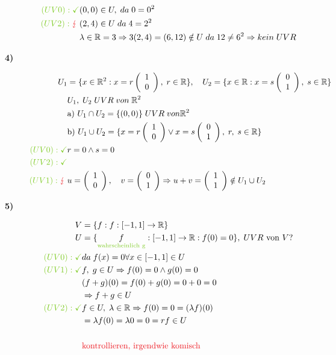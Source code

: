 \documentclass[12pt,a4paper]{article}%
\numberwithin{equation}{section}
\newcommand{\R}{\mathbb{R}} %
\def\colRed#1{\begingroup\color{Red}{#1}\endgroup}
\def\colGreen#1{\begingroup\color{LimeGreen}{#1}\endgroup}
\def\usGreen#1#2{\underset{\colGreen{#1}}{#2}}
\def\vecT#1{\left(\begin{array}{c} #1 \end{array}\right)}
\numberwithin{equation}{subsection}
\begin{document}
\begin{description}
\begin{align*}
		      \colGreen{(UV0): \checkmark} &(0,0) \in U,\;da\; 0 = 0^2\\
		      \colGreen{(UV2): }\; \colRed{\lightning} \;&(2,4) \in U\; da\; 4 = 2^2\\
		      &\lambda \in \R = 3 \Rightarrow 3(2,4) = (6,12) \notin U \; da \; 12 \neq 6^2 \Rightarrow kein \; UVR
		    \end{align*}
		    \item[\textbf{4)}]
		    \begin{align*}
		      U_1 &= \lbrace x \in \R^2: x =  r \vecT{1\\0},\;r \in \R \rbrace , \quad U_2 = \lbrace x \in \R : x = s \vecT{0\\1},\; s \in \R \rbrace \\
		      &U_1,\; U_2\; UVR \; von \; \R^2\\
		      &\text{a) } U_1 \cap U_2 = \lbrace (0,0) \rbrace \; UVR \; von \R^2\\
		      &\text{b) } U_1 \cup U_2 = \lbrace x = r\vecT{1\\0} \lor x = s\vecT{0\\1},\;r,\;s \in \R \rbrace \\
		      \colGreen{(UV0): \checkmark} &r = 0 \land s = 0\\
		      \colGreen{(UV2): \checkmark} &\\
		      \colGreen{(UV1): }\; \colRed{\lightning} \;&u = \vecT{1\\0},\quad v = \vecT{0\\1} \Rightarrow u + v = \vecT{1\\1} \notin U_1 \cup U_2
		    \end{align*}
		    \item[\textbf{5)}]
		    \begin{align*}
	        V &= \lbrace f: f:[-1,1] \rightarrow \R \rbrace \\
	        U &= \lbrace \usGreen{\text{wahrscheinlich g}}{f}: [-1,1] \rightarrow \R: f(0) = 0 \rbrace, \; UVR \text{ von } V?\\
	        \colGreen{(UV0): \checkmark} &da\; f(x) = 0 \forall x \in [-1,1] \in U\\
	        \colGreen{(UV1): \checkmark} &f,\;g \in U \Rightarrow f(0) = 0 \land g(0) = 0 \\
	        &(f+g)(0) = f(0)+g(0) = 0+0 = 0\\
	        &\Rightarrow f+g \in U\\
	        \colGreen{(UV2): \checkmark} &f \in U,\; \lambda \in \R \Rightarrow f(0) = 0 = (\lambda f)(0)\\
	        &= \lambda f(0) = \lambda 0 = 0 = r f \in U\\
	        \\&\text{\colRed{kontrollieren, irgendwie komisch}}	    
		    \end{align*}
		  \end{description}
		  
\end{document}
